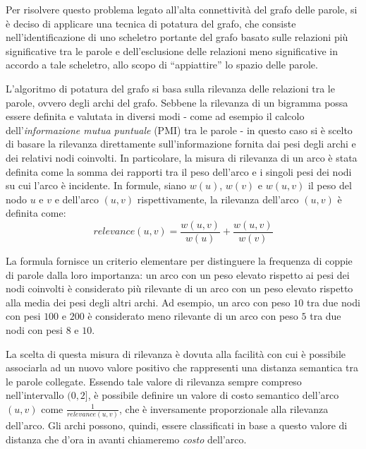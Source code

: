 Per risolvere questo problema legato all'alta connettività del grafo delle parole, si è deciso di applicare
una tecnica di potatura del grafo, che consiste nell'identificazione di uno scheletro portante del grafo
basato sulle relazioni più significative tra le parole e dell'esclusione delle relazioni meno significative in
accordo a tale scheletro, allo scopo di ``appiattire'' lo spazio delle parole.


L'algoritmo di potatura del grafo si basa sulla rilevanza delle relazioni tra le parole, ovvero degli archi del grafo.
Sebbene la rilevanza di un bigramma possa essere definita e valutata in diversi modi - come ad esempio il calcolo
dell'\textit{informazione mutua puntuale} (PMI) tra le parole - in questo caso si è scelto di basare la rilevanza
direttamente sull'informazione fornita dai pesi degli archi e dei relativi nodi coinvolti.
In particolare, la misura di rilevanza di un arco è stata definita come la somma dei rapporti tra il peso dell'arco
e i singoli pesi dei nodi su cui l'arco è incidente.
In formule, siano $w(u)$, $w(v)$ e $w(u, v)$ il peso del nodo $u$ e $v$ e dell'arco $(u, v)$ rispettivamente,
la rilevanza dell'arco $(u, v)$ è definita come:
\begin{equation*}
    relevance(u, v) = \frac{w(u, v)}{w(u)} + \frac{w(u, v)}{w(v)}
\end{equation*}

La formula fornisce un criterio elementare per distinguere la frequenza di coppie di parole dalla loro importanza:
un arco con un peso elevato rispetto ai pesi dei nodi coinvolti è considerato più rilevante di un arco con un peso
elevato rispetto alla media dei pesi degli altri archi.
Ad esempio, un arco con peso $10$ tra due nodi con pesi $100$ e $200$ è considerato meno rilevante di un arco con peso $5$
tra due nodi con pesi $8$ e $10$.

La scelta di questa misura di rilevanza è dovuta alla facilità con cui è possibile associarla ad un nuovo valore
positivo che rappresenti una distanza semantica tra le parole collegate.
Essendo tale valore di rilevanza sempre compreso nell'intervallo $(0, 2]$, è possibile definire un valore di costo
semantico dell'arco $(u, v)$ come $\frac{1}{relevance(u, v)}$, che è inversamente proporzionale alla
rilevanza dell'arco.
Gli archi possono, quindi, essere classificati in base a questo valore di distanza che d'ora in avanti chiameremo
\textit{costo} dell'arco.

